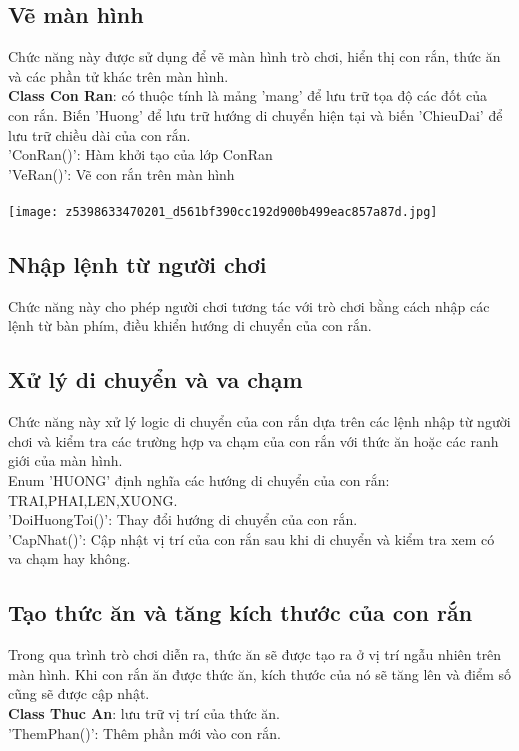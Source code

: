 \documentclass[article]{llncs}
\begin{document}
\subsection{Vẽ màn hình}
    Chức năng này được sử dụng để vẽ màn hình trò chơi, hiển thị con rắn, thức ăn và các phần tử khác trên màn hình.\\
    \textbf{Class Con Ran}: có thuộc tính là mảng 'mang' để lưu trữ tọa độ các đốt của con rắn. Biến 'Huong' để lưu trữ hướng di chuyển hiện tại và biến 'ChieuDai' để lưu trữ chiều dài của con rắn.\\
    'ConRan()': Hàm khởi tạo của lớp ConRan\\
    'VeRan()': Vẽ con rắn trên màn hình\\
    
    \\
    \texttt{[image: z5398633470201\_d561bf390cc192d900b499eac857a87d.jpg]}
\subsection{Nhập lệnh từ người chơi}
    Chức năng này cho phép người chơi tương tác với trò chơi bằng cách nhập các lệnh từ bàn phím, điều khiển hướng di chuyển của con rắn.
\subsection{Xử lý di chuyển và va chạm}
    Chức năng này xử lý logic di chuyển của con rắn dựa trên các lệnh nhập từ người chơi và kiểm tra các trường hợp va chạm của con rắn với thức ăn hoặc các ranh giới của màn hình.\\
    Enum 'HUONG' định nghĩa các hướng di chuyển của con rắn: TRAI,PHAI,LEN,XUONG.\\
    'DoiHuongToi()': Thay đổi hướng di chuyển của con rắn.\\
     'CapNhat()': Cập nhật vị trí của con rắn sau khi di chuyển và kiểm tra xem có va chạm hay không.
\subsection{Tạo thức ăn và tăng kích thước của con rắn}
    Trong qua trình trò chơi diễn ra, thức ăn sẽ được tạo ra ở vị trí ngẫu nhiên trên màn hình. Khi con rắn ăn được thức ăn, kích thước của nó sẽ tăng lên và điểm số cũng sẽ được cập nhật.\\
    \textbf{Class Thuc An}: lưu trữ vị trí của thức ăn.\\
    'ThemPhan()': Thêm phần mới vào con rắn.\\
\end{document}
